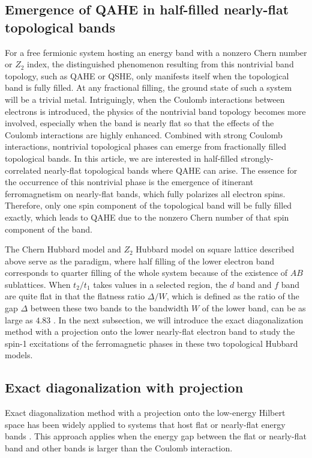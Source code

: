 \documentclass[amsmath,superscriptaddress,showpacs,aps,prb,twocolumn]{revtex4-1}
\begin{document}
\subsection{Emergence of QAHE in half-filled nearly-flat topological bands}\label{emerg_qahe}
\par For a free fermionic system hosting an energy band with a nonzero Chern number or $Z_2$ index, the distinguished phenomenon resulting from this nontrivial band topology, such as QAHE or QSHE, only manifests itself when the topological band is fully filled. At any fractional filling, the ground state of such a system will be a trivial metal. Intriguingly, when the Coulomb interactions between electrons is introduced, the physics of the nontrivial band topology becomes more involved, especially when the band is nearly flat so that the effects of the Coulomb interactions are highly enhanced. Combined with strong Coulomb interactions, nontrivial topological phases can emerge from fractionally filled topological bands. In this article, we are interested in half-filled strongly-correlated nearly-flat topological bands where QAHE can arise\cite{NSCM_PRL2011,DG_PRB2015}. The essence for the occurrence of this nontrivial phase is the emergence of itinerant ferromagnetism on nearly-flat bands\cite{T_PTP1998}, which fully polarizes all electron spins. Therefore, only one spin component of the topological band will be fully filled exactly, which leads to QAHE due to the nonzero Chern number of that spin component of the band.

\par The Chern Hubbard model and $Z_2$ Hubbard model on square lattice described above serve as the paradigm, where half filling of the lower electron band corresponds to quarter filling of the whole system because of the existence of $AB$ sublattices. When $t_2/t_1$ takes values in a selected region, the $d$ band and $f$ band are quite flat in that the flatness ratio $\Delta/W$, which is defined as the ratio of the gap $\Delta$ between these two bands to the bandwidth $W$ of the lower band, can be as large as $4.83$ \cite{NSCM_PRL2011,DG_PRB2015}. In the next subsection, we will introduce the exact diagonalization method with a projection onto the lower nearly-flat electron band to study the spin-1 excitations of the ferromagnetic phases in these two topological Hubbard models.

\subsection{Exact diagonalization with projection}\label{exact_diag_proj}
\par Exact diagonalization method with a projection onto the low-energy Hilbert space has been widely applied to systems that host flat or nearly-flat energy bands \cite{NSCM_PRL2011,RB_PRX2011,NSRCM_PRB2011,SGDL_PRB2018,NSRCM_PRL2012}. This approach applies when the energy gap between the flat or nearly-flat band and other bands is larger than the Coulomb interaction.
\end{document}
